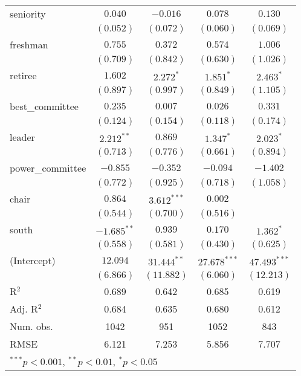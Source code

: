 \documentclass[12pt]{article}
\begin{document}
\begin{table}[H]
\begin{center}
\begin{tabular}{l c c c c }
			seniority                     & $0.040$       & $-0.016$      & $0.078$        & $0.130$        \\
			& $(0.052)$     & $(0.072)$     & $(0.060)$      & $(0.069)$      \\
			freshman                      & $0.755$       & $0.372$       & $0.574$        & $1.006$        \\
			& $(0.709)$     & $(0.842)$     & $(0.630)$      & $(1.026)$      \\
			retiree                       & $1.602$       & $2.272^{*}$   & $1.851^{*}$    & $2.463^{*}$    \\
			& $(0.897)$     & $(0.997)$     & $(0.849)$      & $(1.105)$      \\
			best\_committee               & $0.235$       & $0.007$       & $0.026$        & $0.331$        \\
			& $(0.124)$     & $(0.154)$     & $(0.118)$      & $(0.174)$      \\
			leader                        & $2.212^{**}$  & $0.869$       & $1.347^{*}$    & $2.023^{*}$    \\
			& $(0.713)$     & $(0.776)$     & $(0.661)$      & $(0.894)$      \\
			power\_committee              & $-0.855$      & $-0.352$      & $-0.094$       & $-1.402$       \\
			& $(0.772)$     & $(0.925)$     & $(0.718)$      & $(1.058)$      \\
			chair                         & $0.864$       & $3.612^{***}$ & $0.002$        &                \\
			& $(0.544)$     & $(0.700)$     & $(0.516)$      &                \\
			south                         & $-1.685^{**}$ & $0.939$       & $0.170$        & $1.362^{*}$    \\
			& $(0.558)$     & $(0.581)$     & $(0.430)$      & $(0.625)$      \\
			(Intercept)                   & $12.094$      & $31.444^{**}$ & $27.678^{***}$ & $47.493^{***}$ \\
			& $(6.866)$     & $(11.882)$    & $(6.060)$      & $(12.213)$     \\
			\hline
			R$^2$                         & 0.689         & 0.642         & 0.685          & 0.619          \\
			Adj. R$^2$                    & 0.684         & 0.635         & 0.680          & 0.612          \\
			Num. obs.                     & 1042          & 951           & 1052           & 843            \\
			RMSE                          & 6.121         & 7.253         & 5.856          & 7.707          \\
			\hline
			\multicolumn{5}{l}{\scriptsize{$^{***}p<0.001$, $^{**}p<0.01$, $^*p<0.05$}}
		\end{tabular}
	\end{center}
\end{table}
\end{document}
